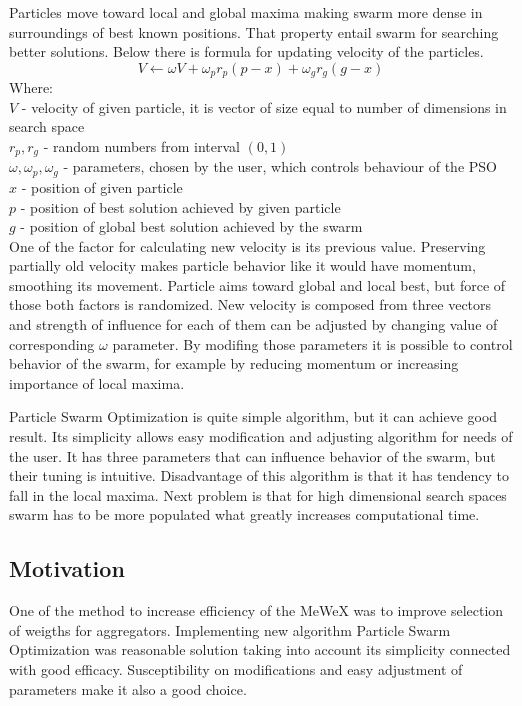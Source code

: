 Particles move toward local and global maxima making swarm more dense in surroundings of best known positions. 
That property entail swarm for searching better solutions.
Below there is formula for updating velocity of the particles.
\[ 
    V \gets \omega V + \omega _{p} r _{p} (p - x) + \omega _{g} r _{g} (g - x)
\]
Where: \\
\(V\)  - velocity of given particle, it is vector of size equal to number of dimensions in search space \\
\(r _{p}, r _{g}\) - random numbers from interval \((0,1)\) \\
\(\omega, \omega _{p}, \omega _{g}\) - parameters, chosen by the user, which controls behaviour of the PSO \\
\(x\)  - position of given particle \\
\(p\)  - position of best solution achieved by given particle \\
\(g\)  - position of global best solution achieved by the swarm \\

One of the factor for calculating new velocity is its previous value. Preserving partially old velocity makes particle behavior 
like it would have momentum, smoothing its movement. Particle aims toward global and local best, but force of those both factors is randomized.
New velocity is composed from three vectors and strength of influence for each of them can be adjusted by changing value 
of corresponding \(\omega\) parameter. By modifing those parameters it is possible to control behavior of the swarm, for example 
by reducing momentum or increasing importance of local maxima.

Particle Swarm Optimization is quite simple algorithm, but it can achieve good result. Its simplicity allows easy modification and adjusting 
algorithm for needs of the user. It has three parameters that can influence behavior of the swarm, but their tuning is intuitive. 
Disadvantage of this algorithm is that it has tendency to fall in the local maxima. Next problem is that for high dimensional search spaces 
swarm has to be more populated what greatly increases computational time. 

\subsection{Motivation}
One of the method to increase efficiency of the MeWeX was to improve selection of weigths for aggregators. 
Implementing new algorithm Particle Swarm Optimization was reasonable solution taking into account its simplicity 
connected with good efficacy. Susceptibility on modifications and easy adjustment of parameters make it also a good choice.

